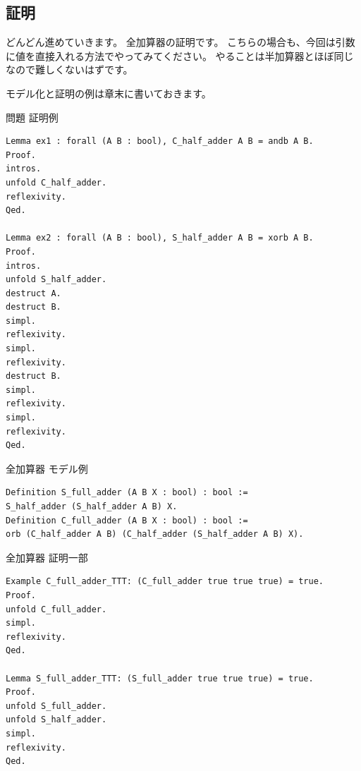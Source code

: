 \documentclass{jsbook}
\begin{document}
\subsection*{証明}
どんどん進めていきます。
全加算器の証明です。
こちらの場合も、今回は引数に値を直接入れる方法でやってみてください。
やることは半加算器とほぼ同じなので難しくないはずです。

モデル化と証明の例は章末に書いておきます。
\newpage
\begin{itembox}[l]{問題 証明例}
\begin{verbatim}
Lemma ex1 : forall (A B : bool), C_half_adder A B = andb A B.
Proof.
intros.
unfold C_half_adder.
reflexivity.
Qed.

Lemma ex2 : forall (A B : bool), S_half_adder A B = xorb A B. 
Proof.
intros.
unfold S_half_adder.
destruct A.
destruct B.
simpl.
reflexivity.
simpl.
reflexivity.
destruct B.
simpl.
reflexivity.
simpl.
reflexivity.
Qed.
\end{verbatim}
\end{itembox}

\begin{itembox}[l]{全加算器 モデル例}
\begin{verbatim}
Definition S_full_adder (A B X : bool) : bool :=
S_half_adder (S_half_adder A B) X.
Definition C_full_adder (A B X : bool) : bool :=
orb (C_half_adder A B) (C_half_adder (S_half_adder A B) X).
\end{verbatim}
\end{itembox}

\begin{itembox}[l]{全加算器 証明一部}
\begin{verbatim}
Example C_full_adder_TTT: (C_full_adder true true true) = true.
Proof.
unfold C_full_adder.
simpl.
reflexivity.
Qed.

Lemma S_full_adder_TTT: (S_full_adder true true true) = true.
Proof.
unfold S_full_adder.
unfold S_half_adder.
simpl.
reflexivity.
Qed.
\end{verbatim}
\end{itembox}
\end{document}
